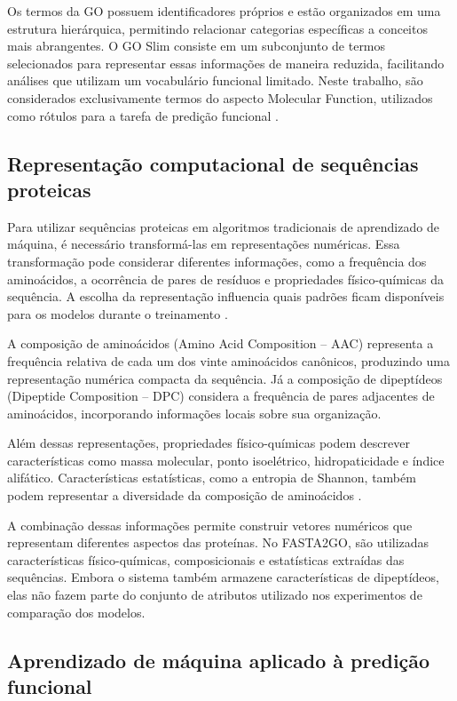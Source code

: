 Os termos da GO possuem identificadores próprios e estão organizados em uma estrutura hierárquica, permitindo relacionar categorias específicas a conceitos mais abrangentes. O GO Slim consiste em um subconjunto de termos selecionados para representar essas informações de maneira reduzida, facilitando análises que utilizam um vocabulário funcional limitado. Neste trabalho, são considerados exclusivamente termos do aspecto Molecular Function, utilizados como rótulos para a tarefa de predição funcional \cite{goconsortium2026}.


\subsection{Representação computacional de sequências proteicas}
\label{subsec:representacao-sequencias}

Para utilizar sequências proteicas em algoritmos tradicionais de aprendizado de máquina, é necessário transformá-las em representações numéricas. Essa transformação pode considerar diferentes informações, como a frequência dos aminoácidos, a ocorrência de pares de resíduos e propriedades físico-químicas da sequência. A escolha da representação influencia quais padrões ficam disponíveis para os modelos durante o treinamento \cite{jing2020}.

A composição de aminoácidos (Amino Acid Composition -- AAC) representa a frequência relativa de cada um dos vinte aminoácidos canônicos, produzindo uma representação numérica compacta da sequência. Já a composição de dipeptídeos (Dipeptide Composition -- DPC) considera a frequência de pares adjacentes de aminoácidos, incorporando informações locais sobre sua organização.

Além dessas representações, propriedades físico-químicas podem descrever características como massa molecular, ponto isoelétrico, hidropaticidade e índice alifático. Características estatísticas, como a entropia de Shannon, também podem representar a diversidade da composição de aminoácidos \cite{kyte1982,ikai1980,shannon1948}.

A combinação dessas informações permite construir vetores numéricos que representam diferentes aspectos das proteínas. No FASTA2GO, são utilizadas características físico-químicas, composicionais e estatísticas extraídas das sequências. Embora o sistema também armazene características de dipeptídeos, elas não fazem parte do conjunto de atributos utilizado nos experimentos de comparação dos modelos.


\subsection{Aprendizado de máquina aplicado à predição funcional}
\label{subsec:aprendizado-maquina}

